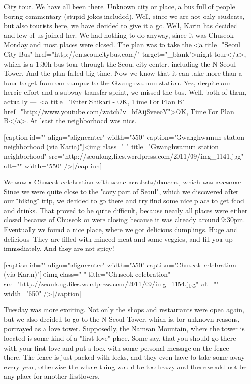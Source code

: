 \begin{post}
	\begin{content}
City tour. We have all been there. Unknown city or place, a bus full of people, boring commentary (stupid jokes included). Well, since we are not only students, but also tourists here, we have decided to give it a go. Well, Karin has decided and few of us joined her. We had nothing to do anyway, since it was Chuseok Monday and most places were closed. The plan was to take the <a title="Seoul City Bus" href="http://en.seoulcitybus.com/" target="_blank">night tour</a>, which is a 1:30h bus tour through the Seoul city center, including the N Seoul Tower. And the plan failed big time. Now we know that it can take more than a hour to get from our campus to the Gwanghwamun station. Yes, despite our heroic effort and a subway transfer sprint, we missed the bus. Well, both of them, actually — <a title="Enter Shikari - OK, Time For Plan B" href="http://www.youtube.com/watch?v=bfAijSveeoY">OK, Time For Plan B</a>. At least the neighborhood was nice.



[caption id="" align="aligncenter" width="550" caption="Gwanghwamun station neighborhood (via Karin)"]<img class=" " title="Gwanghwamun station neighborhood" src="http://seoulong.files.wordpress.com/2011/09/img_1141.jpg" alt="" width="550" />[/caption]



We saw a Chuseok celebration with some acrobats/dancers, which was awesome. Since we were quite close to the "cozy part of Seoul", which we discovered after our "hiking" trip, we decided to go there and try find some nice place to get food and drinks. That proved to be quite difficult, because nearly all places were either closed because of Chuseok or were closing because it was already around 9:30pm. Eventually we found a nice place, where we got delicious dumplings. Huge and delicious. They are filled with minced meat and some veggies, and fill you up immediately. And they are not spicy!



[caption id="" align="aligncenter" width="550" caption="Chuseok celebration (via Karin)"]<img class=" " title="Chuseok celebration" src="http://seoulong.files.wordpress.com/2011/09/img_1154.jpg" alt="" width="550" />[/caption]



Tuesday was more exciting. Not only the shops and restaurants were open again, but we also decided to go to the N Seoul Tower, which is, for unknown reasons, portrayed as a love tower. Supposedly, the Namsan Mountain, where the tower is located is some kind of a "first love" place. Some say, that you should go there with your first love and put a lock with some personal message on the fence there. The fence is just packed with locks, and they even have to take some away every year, otherwise the whole thing would be too heavy and there would not be any place for another firstlovers.




\end{content}
\end{post}
